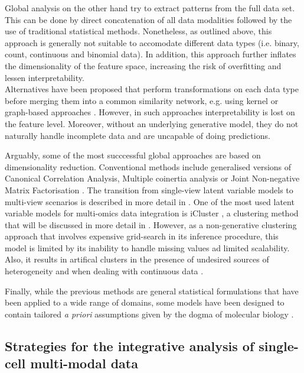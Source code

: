 Global analysis on the other hand try to extract patterns from the full data set. This can be done by direct concatenation of all data modalities followed by the use of traditional statistical methods. Nonetheless, as outlined above, this approach is generally not suitable to accomodate different data types (i.e. binary, count, continuous and binomial data). In addition, this approach further inflates the dimensionality of the feature space, increasing the risk of overfitting and lessen interpretability.\\
Alternatives have been proposed that perform transformations on each data type before merging them into a common similarity network, e.g. using kernel or graph-based approaches \cite{Lanckriet2004, Wang2014}. However, in such approaches interpretability is lost on the feature level. Moreover, without an underlying generative model, they do not naturally handle incomplete data and are uncapable of doing predictions.

Arguably, some of the most succcessful global approaches are based on dimensionality reduction. Conventional methods include generalised versions of Canonical Correlation Analysis, Multiple coinertia analysis\cite{Hanafi2011} or Joint Non-negative Matrix Factorisation \cite{Liu2012}. The transition from single-view latent variable models to multi-view scenarios is described in more detail in . One of the most used latent variable models for multi-omics data integration is iCluster \cite{Shen2009, Mo2013}, a clustering method that will be discussed in more detail in . However, as a non-generative clustering approach that involves expensive grid-search in its inference procedure, this model is limited by its inability to handle missing values ad limited scalability. Also, it results in artifical clusters in the presence of undesired sources of heterogeneity and when dealing with continuous data \cite{Argelaguet2018}.

Finally, while the previous methods are general statistical formulations that have been applied to a wide range of domains, some models have been designed to contain tailored \textit{a priori} assumptions given by the dogma of molecular biology \cite{Sass2013}. 


\subsection{Strategies for the integrative analysis of single-cell multi-modal data }

